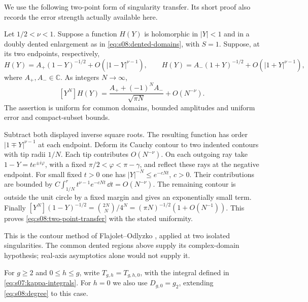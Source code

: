 We use the following two-point form of singularity transfer. Its
short proof also records the error strength actually available here.

\begin{lmm}\label{lmm:s08:transfer}
Let $1/2<\nu<1$. Suppose a function $H(Y)$ is holomorphic in
$|Y|<1$ and in a doubly dented enlargement as in
\eqref{eq:s08:dented-domains}, with $S=1$. Suppose, at its two
endpoints, respectively,
\[
 H(Y)=A_+(1-Y)^{-1/2}+O(|1-Y|^{\nu-1}),\qquad
 H(Y)=A_-(1+Y)^{-1/2}+O(|1+Y|^{\nu-1}),
\]
where $A_+,A_-\in\mathbb C$. As integers $N\to\infty$,
\begin{equation}\label{eq:s08:two-point-transfer}
 [Y^N]H(Y)=\frac{A_++(-1)^NA_-}{\sqrt{\pi N}}
                                     +O(N^{-\nu}).
\end{equation}
The assertion is uniform for common domains, bounded amplitudes
and uniform error and compact-subset bounds.
\end{lmm}
\begin{prf}
Subtract both displayed inverse square roots. The resulting function
has order $|1\mp Y|^{\nu-1}$ at each endpoint. Deform its Cauchy
contour to two indented contours with tip radii $1/N$. Each tip
contributes $O(N^{-\nu})$. On each outgoing ray take
$1-Y=t e^{\pm i\varphi}$, with a fixed
$\pi/2<\varphi<\pi-\gamma$, and reflect these rays at the
negative endpoint. For small fixed $t>0$ one has
$|Y|^{-N}\leq e^{-cNt}$, $c>0$. Their contributions are bounded by
$C\int_{1/N}^{r}t^{\nu-1}e^{-cNt}\,\dd t=O(N^{-\nu})$.
The remaining contour is outside the unit circle by a fixed margin
and gives an exponentially small term. Finally
$[Y^N](1-Y)^{-1/2}=\binom{2N}{N}/4^N
=(\pi N)^{-1/2}(1+O(N^{-1}))$.
This proves \eqref{eq:s08:two-point-transfer} with the stated
uniformity.
\end{prf}

\begin{rmk}
This is the contour method of Flajolet--Odlyzko
\cite[\S 2]{FO90}, applied at two isolated singularities. The common
dented regions above supply its complex-domain hypothesis; real-axis
asymptotics alone would not supply it.
\end{rmk}

For $g\geq2$ and $0\leq h\leq g$, write
$T_{g,h}=T_{g,h,0}$, with the integral defined in
\eqref{eq:s07:kappa-integrals}. For $h=0$ we also use
$D_{g,0}=g_2$, extending \eqref{eq:s08:degree} to this case.

